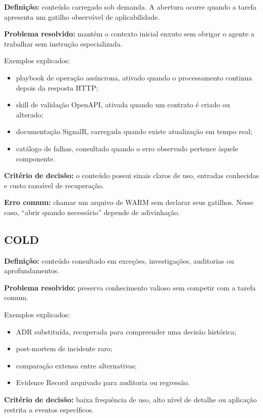 \documentclass[
  10pt,
  a4paper,
  oneside]{book}
\providecommand{\tightlist}{%
  \setlength{\itemsep}{0pt}\setlength{\parskip}{0pt}}
\begin{document}
\textbf{Definição:} conteúdo carregado sob demanda. A abertura ocorre
quando a tarefa apresenta um gatilho observável de aplicabilidade.

\textbf{Problema resolvido:} mantém o contexto inicial enxuto sem
obrigar o agente a trabalhar sem instrução especializada.

Exemplos explicados:

\begin{itemize}
\tightlist
\item
  playbook de operação assíncrona, ativado quando o processamento
  continua depois da resposta HTTP;
\item
  skill de validação OpenAPI, ativada quando um contrato é criado ou
  alterado;
\item
  documentação SignalR, carregada quando existe atualização em tempo
  real;
\item
  catálogo de falhas, consultado quando o erro observado pertence àquele
  componente.
\end{itemize}

\textbf{Critério de decisão:} o conteúdo possui sinais claros de uso,
entradas conhecidas e custo razoável de recuperação.

\textbf{Erro comum:} chamar um arquivo de WARM sem declarar seus
gatilhos. Nesse caso, ``abrir quando necessário'' depende de
adivinhação.

\hypertarget{cold}{%
\subsection{COLD}\label{cold}}

\textbf{Definição:} conteúdo consultado em exceções, investigações,
auditorias ou aprofundamentos.

\textbf{Problema resolvido:} preserva conhecimento valioso sem competir
com a tarefa comum.

Exemplos explicados:

\begin{itemize}
\tightlist
\item
  ADR substituída, recuperada para compreender uma decisão histórica;
\item
  post-mortem de incidente raro;
\item
  comparação extensa entre alternativas;
\item
  Evidence Record arquivado para auditoria ou regressão.
\end{itemize}

\textbf{Critério de decisão:} baixa frequência de uso, alto nível de
detalhe ou aplicação restrita a eventos específicos.
\end{document}
